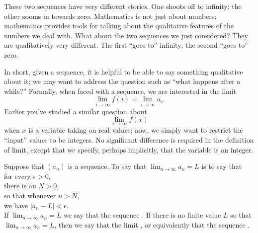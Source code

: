 \documentclass{ximera}
\begin{document}

These two sequences have very different stories.  One shoots off to
infinity; the other zooms in towards zero.  Mathematics is not just
about numbers; mathematics provides tools for talking about the
qualitative features of the numbers we deal with.  What about the two
sequences we just considered?  They are qualitatively very different.
The first ``goes to'' infinity; the second ``goes to'' zero.

In short, given a sequence, it is helpful to be able to say something
qualitative about it; we may want to address the question such as
``what happens after a while?'' Formally, when faced with a sequence,
we are interested in the limit
\[
\lim_{i\to \infty} f(i) = \lim_{i\to\infty} a_i.
\]
Earlier you've studied a similar question about
\[
\lim_{x\to\infty} f(x)
\]
when $x$ is a variable taking on real values; now, we simply want to
restrict the ``input'' values to be integers. No significant
difference is required in the definition of limit, except that we
specify, perhaps implicitly, that the variable is an integer.

\begin{definition}
\label{definition:limit-of-a-sequence}
Suppose that $\left(a_n\right)$ is a sequence.
To say that $\lim_{n\to \infty}a_n=L$ is to say that \\
\null\quad for every $\epsilon>0$, \\
\null\quad\quad there is an $N > 0$, \\
\null\quad so that whenever $n>N$, \\
\null\quad\quad we have $|a_n-L|<\epsilon$. \\
If $\displaystyle\lim_{n\to\infty}a_n=L$ we say that the sequence
.  If there is no finite value $L$ so
that $\displaystyle\lim_{n\to\infty}a_n = L$, then we say that the limit
, or equivalently that the sequence
.
\end{definition} 
\end{document}
